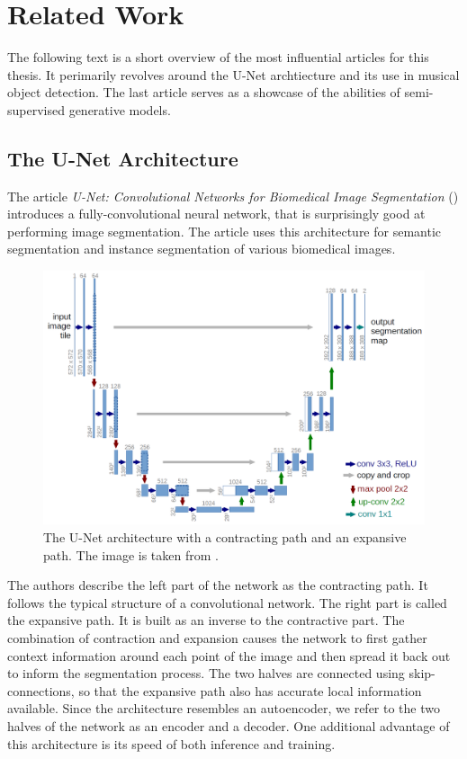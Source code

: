 \chapter{Related Work}
\label{chap:RelatedWork}

The following text is a short overview of the most influential articles for this thesis. It perimarily revolves around the U-Net archtiecture and its use in musical object detection. The last article serves as a showcase of the abilities of semi-supervised generative models.

\section{The U-Net Architecture}

The article \emph{U-Net: Convolutional Networks for Biomedical Image Segmentation} (\cite{UNet}) introduces a fully-convolutional neural network, that is surprisingly good at performing image segmentation. The article uses this architecture for semantic segmentation and instance segmentation of various biomedical images.

\begin{figure}[ht]
    \centering
    \includegraphics[width=145mm]{../img/u-net-architecture.png}
    \caption{The U-Net architecture with a contracting path and an expansive path. The image is taken from \cite{UNet}.}
    \label{fig:UNetArchitecture}
\end{figure}

The authors describe the left part of the network as the contracting path. It follows the typical structure of a convolutional network. The right part is called the expansive path. It is built as an inverse to the contractive part. The combination of contraction and expansion causes the network to first gather context information around each point of the image and then spread it back out to inform the segmentation process. The two halves are connected using skip-connections, so that the expansive path also has accurate local information available. Since the architecture resembles an autoencoder, we refer to the two halves of the network as an encoder and a decoder. One additional advantage of this architecture is its speed of both inference and training.


